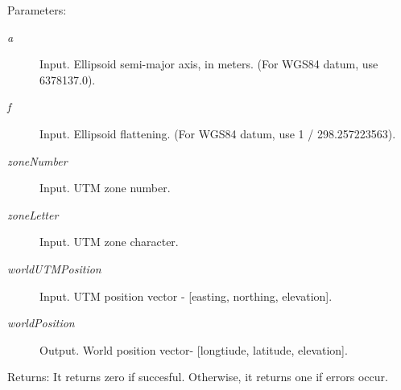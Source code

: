 \begin{Desc}
\item[Parameters:]
\begin{description}
\item[{\em a}]Input. Ellipsoid semi-major axis, in meters. (For WGS84 datum, use 6378137.0). \item[{\em f}]Input. Ellipsoid flattening. (For WGS84 datum, use 1 / 298.257223563). \item[{\em zoneNumber}]Input. UTM zone number. \item[{\em zoneLetter}]Input. UTM zone character. \item[{\em worldUTMPosition}]Input. UTM position vector - \mbox{[}easting, northing, elevation\mbox{]}. \item[{\em worldPosition}]Output. World position vector- \mbox{[}longtiude, latitude, elevation\mbox{]}.\end{description}
\end{Desc}
\begin{Desc}
\item[Returns:]It returns zero if succesful. Otherwise, it returns one if errors occur. \end{Desc}
